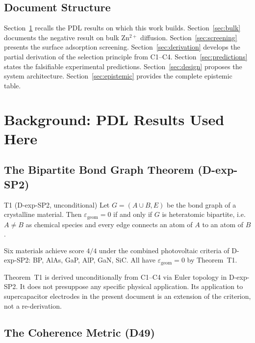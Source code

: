 \documentclass[11pt,a4paper]{article}
\newcommand{\egeom}{\varepsilon_{\mathrm{geom}}}
\begin{document}
\subsection{Document Structure}

Section~\ref{sec:background} recalls the PDL results on which this work builds. Section~\ref{sec:bulk} documents the negative result on bulk Zn$^{2+}$ diffusion. Section~\ref{sec:screening} presents the surface adsorption screening. Section~\ref{sec:derivation} develops the partial derivation of the selection principle from C1--C4. Section~\ref{sec:predictions} states the falsifiable experimental predictions. Section~\ref{sec:design} proposes the system architecture. Section~\ref{sec:epistemic} provides the complete epistemic table.

\section{Background: PDL Results Used Here}
\label{sec:background}

\subsection{The Bipartite Bond Graph Theorem (D-exp-SP2)}

\begin{theorem}{T1 (D-exp-SP2, unconditional)}
Let $G = (A \cup B, E)$ be the bond graph of a crystalline material. Then $\egeom = 0$ if and only if $G$ is heteratomic bipartite, i.e.\ $A \neq B$ as chemical species and every edge connects an atom of $A$ to an atom of $B$.
\end{theorem}

Six materials achieve score $4/4$ under the combined photovoltaic criteria of D-exp-SP2: BP, AlAs, GaP, AlP, GaN, SiC. All have $\egeom = 0$ by Theorem~T1.

\begin{remark}
Theorem~T1 is derived unconditionally from C1--C4 via Euler topology in D-exp-SP2. It does not presuppose any specific physical application. Its application to supercapacitor electrodes in the present document is an extension of the criterion, not a re-derivation.
\end{remark}

\subsection{The Coherence Metric (D49)}
\end{document}
